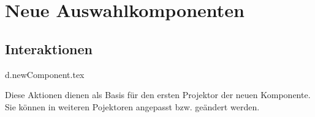 \chapter{Neue Auswahlkomponenten}

\section{Interaktionen}

{d.newComponent.tex}

Diese Aktionen dienen als Basis für den ersten Projektor der neuen Komponente. 
Sie können in weiteren Pojektoren angepasst bzw. geändert werden.